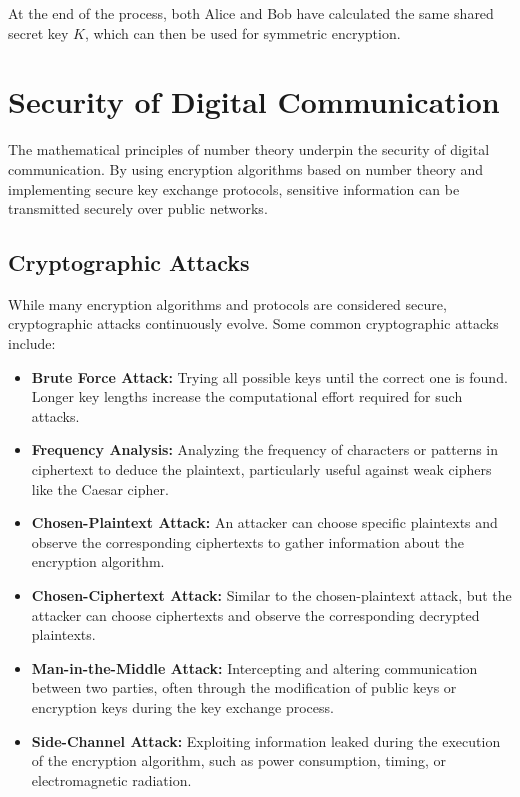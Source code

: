 \documentclass{article}
\begin{document}
At the end of the process, both Alice and Bob have calculated the same shared secret key $K$, which can then be used for symmetric encryption.

\section{Security of Digital Communication}
The mathematical principles of number theory underpin the security of digital communication. By using encryption algorithms based on number theory and implementing secure key exchange protocols, sensitive information can be transmitted securely over public networks.

\subsection{Cryptographic Attacks}
While many encryption algorithms and protocols are considered secure, cryptographic attacks continuously evolve. Some common cryptographic attacks include:

\begin{itemize}
    \item \textbf{Brute Force Attack:} Trying all possible keys until the correct one is found. Longer key lengths increase the computational effort required for such attacks.

    \item \textbf{Frequency Analysis:} Analyzing the frequency of characters or patterns in ciphertext to deduce the plaintext, particularly useful against weak ciphers like the Caesar cipher.

    \item \textbf{Chosen-Plaintext Attack:} An attacker can choose specific plaintexts and observe the corresponding ciphertexts to gather information about the encryption algorithm.

    \item \textbf{Chosen-Ciphertext Attack:} Similar to the chosen-plaintext attack, but the attacker can choose ciphertexts and observe the corresponding decrypted plaintexts.

    \item \textbf{Man-in-the-Middle Attack:} Intercepting and altering communication between two parties, often through the modification of public keys or encryption keys during the key exchange process.

    \item \textbf{Side-Channel Attack:} Exploiting information leaked during the execution of the encryption algorithm, such as power consumption, timing, or electromagnetic radiation.
\end{itemize}
\end{document}
